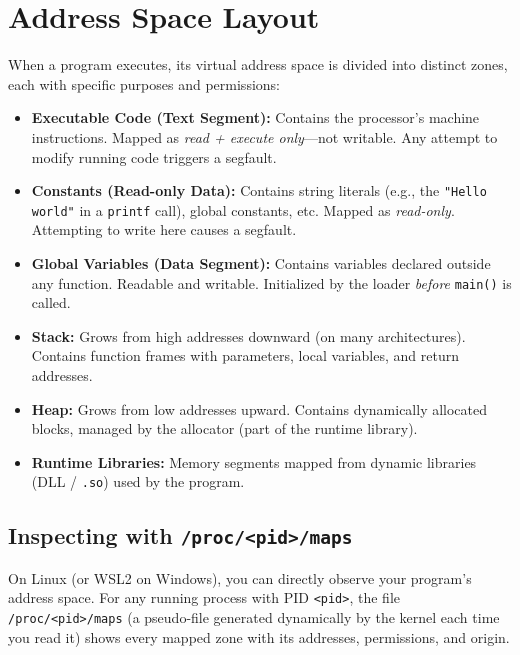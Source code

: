 \section{Address Space Layout}

When a program executes, its virtual address space is divided into distinct zones, each with specific purposes and permissions:


\begin{itemize}
    \item \textbf{Executable Code (Text Segment):} Contains the processor's machine instructions. Mapped as \emph{read + execute only}---not writable. Any attempt to modify running code triggers a segfault.
    \item \textbf{Constants (Read-only Data):} Contains string literals (e.g., the \texttt{"Hello world"} in a \texttt{printf} call), global constants, etc. Mapped as \emph{read-only}. Attempting to write here causes a segfault.
    \item \textbf{Global Variables (Data Segment):} Contains variables declared outside any function. Readable and writable. Initialized by the loader \emph{before} \texttt{main()} is called.
    \item \textbf{Stack:} Grows from high addresses downward (on many architectures). Contains function frames with parameters, local variables, and return addresses.
    \item \textbf{Heap:} Grows from low addresses upward. Contains dynamically allocated blocks, managed by the allocator (part of the runtime library).
    \item \textbf{Runtime Libraries:} Memory segments mapped from dynamic libraries (DLL / \texttt{.so}) used by the program.
\end{itemize}

\subsection{Inspecting with \texttt{/proc/<pid>/maps}}

On Linux (or WSL2 on Windows), you can directly observe your program's address space. For any running process with PID \texttt{<pid>}, the file \texttt{/proc/<pid>/maps} (a pseudo-file generated dynamically by the kernel each time you read it) shows every mapped zone with its addresses, permissions, and origin.


